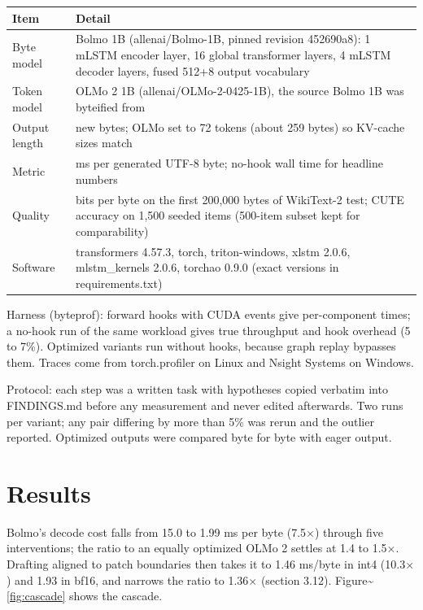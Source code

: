 \documentclass[11pt,a4paper]{article}
\newcommand{\x}{\ensuremath{\times}}
\begin{document}
\begin{center}\small\setlength{\tabcolsep}{4pt}
\begin{tabular}{@{}>{\raggedright\arraybackslash}p{}>{\raggedright\arraybackslash}p{}@{}}
\toprule
\textbf{Item} & \textbf{Detail} \\
\midrule
Byte model & Bolmo 1B \citep{minixhofer2026byteification} (allenai/Bolmo-1B, pinned revision 452690a8): 1 mLSTM encoder layer, 16 global transformer layers, 4 mLSTM decoder layers, fused 512+8 output vocabulary \\
Token model & OLMo 2 1B \citep{walsh2025olmo2} (allenai/OLMo-2-0425-1B), the source Bolmo 1B was byteified from \\
Output length & 256 new bytes; OLMo set to 72 tokens (about 259 bytes) so KV-cache sizes match \\
Metric & ms per generated UTF-8 byte; no-hook wall time for headline numbers \\
Quality & bits per byte on the first 200,000 bytes of WikiText-2 test; CUTE \citep{edman2024cute} accuracy on 1,500 seeded items (500-item subset kept for comparability) \\
Software & transformers 4.57.3, torch, triton-windows, xlstm 2.0.6, mlstm\_kernels 2.0.6, torchao 0.9.0 (exact versions in requirements.txt) \\
\bottomrule
\end{tabular}
\end{center}

Harness (byteprof): forward hooks with CUDA events give per-component times; a no-hook run of the same workload gives true throughput and hook overhead (5 to 7\%). Optimized variants run without hooks, because graph replay bypasses them. Traces come from torch.profiler on Linux and Nsight Systems on Windows.

Protocol: each step was a written task with hypotheses copied verbatim into FINDINGS.md before any measurement and never edited afterwards. Two runs per variant; any pair differing by more than 5\% was rerun and the outlier reported. Optimized outputs were compared byte for byte with eager output.

\section{Results}\label{results}

Bolmo's decode cost falls from 15.0 to 1.99 ms per byte (7.5\x{}) through five interventions; the ratio to an equally optimized OLMo 2 settles at 1.4 to 1.5\x{}. Drafting aligned to patch boundaries then takes it to 1.46 ms/byte in int4 (10.3\x{}) and 1.93 in bf16, and narrows the ratio to 1.36\x{} (section 3.12). Figure\textasciitilde \ref{fig:cascade} shows the cascade.
\end{document}
